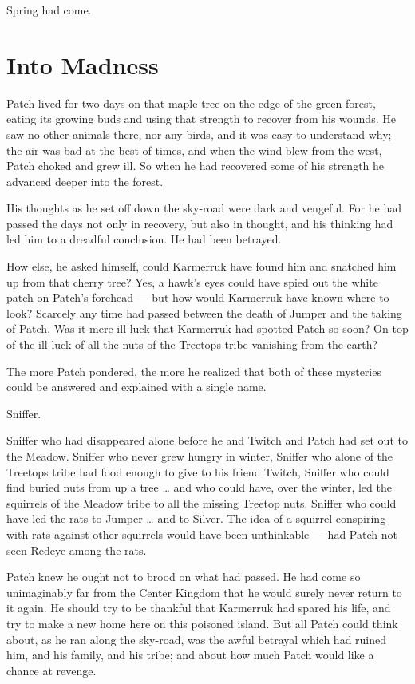 \documentclass[ebook,oneside,openany,17pt]{memoir}
\newenvironment{tolerant}[1]{%
  \par\tolerance=#1\relax
}{%
  \par
}
\renewcommand{\thechapter}{\Roman{chapter}}
\newcounter{sections}
\newcommand{\sections}[1]{%
  \section*{#1}
  \addtocounter{sections}{1}%
  \pdfbookmark[1]{#1}{section.\thechapter.\thesections}}
\begin{document}
Spring had come.


\sections{Into Madness}

Patch lived for two days on that maple tree on the edge of the green
forest, eating its growing buds and using that strength to recover
from his wounds. He saw no other animals there, nor any birds, and it
was easy to understand why; the air was bad at the best of times, and
when the wind blew from the west, Patch choked and grew ill. So when
he had recovered some of his strength he advanced deeper into the
forest.

His thoughts as he set off down the sky-road were dark and
vengeful. For he had passed the days not only in recovery, but also in
thought, and his thinking had led him to a dreadful conclusion. He had
been betrayed.

\begin{tolerant}{1000}
How else, he asked himself, could Karmerruk have found him and
snatched him up from that cherry tree? Yes, a hawk’s eyes could have
spied out the white patch on Patch’s forehead — but how would
Karmerruk have known where to look? Scarce\-ly any time had passed
between the death of Jumper and the taking of Patch. Was it mere
ill-luck that Karmerruk had spotted Patch so soon? On top of the
ill-luck of all the nuts of the Treetops tribe vanishing from the
earth?
\end{tolerant}

The more Patch pondered, the more he realized that both of these
mysteries could be answered and explained with a single name.

Sniffer.

Sniffer who had disappeared alone before he and Twitch and Patch had
set out to the Meadow. Sniffer who never grew hungry in winter,
Sniffer who alone of the Treetops tribe had food enough to give to his
friend Twitch, Sniffer who could find buried nuts from up a tree … and
who could have, over the winter, led the squirrels of the Meadow tribe
to all the missing Treetop nuts. Sniffer who could have led the rats
to Jumper … and to Silver. The idea of a squirrel conspiring with rats
against other squirrels would have been unthinkable — had Patch not
seen Redeye among the rats.

Patch knew he ought not to brood on what had passed. He had come so
unimaginably far from the Center Kingdom that he would surely never
return to it again. He should try to be thankful that Karmerruk had
spared his life, and try to make a new home here on this poisoned
island. But all Patch could think about, as he ran along the sky-road,
was the awful betrayal which had ruined him, and his family, and his
tribe; and about how much Patch would like a chance at revenge.
\end{document}
